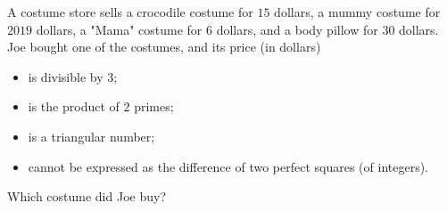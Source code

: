 A costume store sells a crocodile costume for $15$ dollars, a mummy costume for $2019$ dollars, a "Mama" costume for $6$ dollars, and a body pillow for $30$ dollars. Joe bought one of the costumes, and its price (in dollars)
\begin{itemize}
\item is divisible by $3$;
\item is the product of $2$ primes;
\item is a triangular number;
\item cannot be expressed as the difference of two perfect squares (of integers).
\end{itemize}
Which costume did Joe buy?
